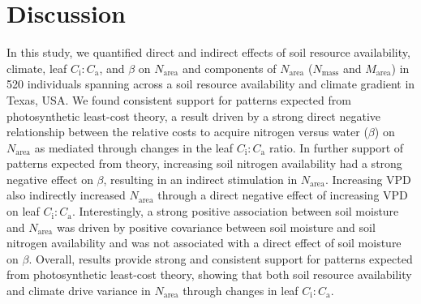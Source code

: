 \section{Discussion}
\noindent In this study, we quantified direct and indirect effects of soil resource availability, climate, leaf $C_\mathrm{i}\mathrm{:}C_\mathrm{a}$, and $\beta$ on $N_\mathrm{area}$ and components of $N_\mathrm{area}$ ($N_\mathrm{mass}$ and $M_\mathrm{area}$) in 520 individuals spanning across a soil resource availability and climate gradient in Texas, USA. We found consistent support for patterns expected from photosynthetic least-cost theory, a result driven by a strong direct negative relationship between the relative costs to acquire nitrogen versus water ($\beta$) on $N_\mathrm{area}$ as mediated through changes in the leaf $C_\mathrm{i}\mathrm{:}C_\mathrm{a}$ ratio. In further support of patterns expected from theory, increasing soil nitrogen availability had a strong negative effect on $\beta$, resulting in an indirect stimulation in $N_\mathrm{area}$. Increasing VPD also indirectly increased $N_\mathrm{area}$ through a direct negative effect of increasing VPD on leaf $C_\mathrm{i}\mathrm{:}C_\mathrm{a}$. Interestingly, a strong positive association between soil moisture and $N_\mathrm{area}$ was driven by positive covariance between soil moisture and soil nitrogen availability and was not associated with a direct effect of soil moisture on $\beta$. Overall, results provide strong and consistent support for patterns expected from photosynthetic least-cost theory, showing that both soil resource availability and climate drive variance in $N_\mathrm{area}$ through changes in leaf $C_\mathrm{i}\mathrm{:}C_\mathrm{a}$.

